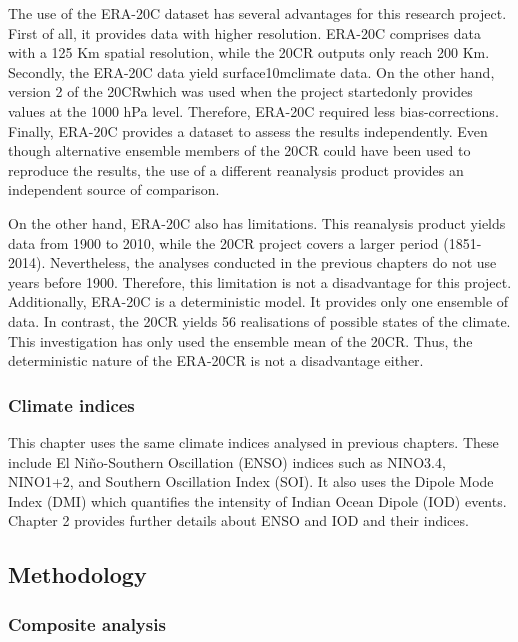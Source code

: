 The use of the ERA-20C dataset has several advantages for this research
project. First of all, it provides data with higher resolution. ERA-20C
comprises data with a 125 Km spatial resolution, while the 20CR outputs
only reach 200 Km. Secondly, the ERA-20C data yield surface\textemdash 10m\textemdash climate
data. On the other hand, version 2 of the 20CR\textemdash which was
used when the project started\textemdash only provides values at the
1000 hPa level. Therefore, ERA-20C required less bias-corrections.
Finally, ERA-20C provides a dataset to assess the results independently.
Even though alternative ensemble members of the 20CR could have been
used to reproduce the results, the use of a different reanalysis product
provides an independent source of comparison.

On the other hand, ERA-20C also has limitations. This reanalysis product
yields data from 1900 to 2010, while the 20CR project covers a larger
period (1851-2014). Nevertheless, the analyses conducted in the previous
chapters do not use years before 1900. Therefore, this limitation
is not a disadvantage for this project. Additionally, ERA-20C is a
deterministic model. It provides only one ensemble of data. In contrast,
the 20CR yields 56 realisations of possible states of the climate.
This investigation has only used the ensemble mean of the 20CR. Thus,
the deterministic nature of the ERA-20CR is not a disadvantage either.


\subsubsection{Climate indices}

This chapter uses the same climate indices analysed in previous chapters.
These include El Ni\~no-Southern Oscillation (ENSO) indices such as
NINO3.4, NINO1+2, and Southern Oscillation Index (SOI). It also uses
the Dipole Mode Index (DMI) which quantifies the intensity of Indian
Ocean Dipole (IOD) events. Chapter 2 provides further details about
ENSO and IOD and their indices.


\subsection{Methodology}


\subsubsection{Composite analysis}

